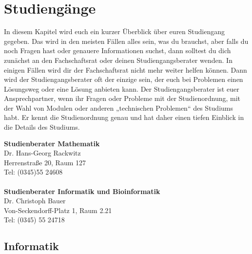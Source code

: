 
\section{Studiengänge}

In diesem Kapitel wird euch ein kurzer Überblick über euren Studiengang gegeben.
Das wird in den meisten Fällen alles sein, was du brauchst, aber falls du noch Fragen hast oder genauere Informationen suchst, dann solltest du dich zunächst an den Fachschaftsrat oder deinen Studiengangsberater wenden.
In einigen Fällen wird dir der Fachschaftsrat nicht mehr weiter helfen können.
Dann wird der Studiengangsberater oft der einzige sein, der euch bei Problemen einen Lösungsweg oder eine Lösung anbieten kann.
Der Studiengangsberater ist euer Ansprechpartner, wenn ihr Fragen oder Probleme mit der Studienordnung, mit der Wahl von Modulen oder anderen „technischen Problemen“ des Studiums habt.
Er kennt die Studienordnung genau und hat daher einen tiefen Einblick in die Details des Studiums.

\textbf{Studienberater Mathematik}\\
Dr. Hans-Georg Rackwitz\\
Herrenstraße 20, Raum 127\\
Tel: (0345)55 24608	\\
\\

\textbf{Studienberater Informatik und Bioinformatik}\\
Dr. Christoph Bauer\\
Von-Seckendorff-Platz 1, Raum 2.21\\
Tel: (0345) 55 24718\\



\subsection{Informatik}
\label{studiengang_informatik}
    
